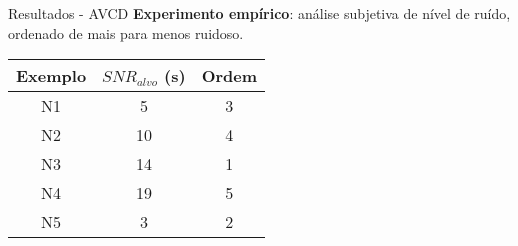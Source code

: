 \begin{frame}{Resultados - AVCD}
    \textbf{Experimento empírico}: análise subjetiva de nível de ruído, ordenado de mais para menos ruidoso.
    \vspace{1cm}
    
    \begin{table} [H]
        \centering
        \begin{tabular}{c|c|c}
    
            \textbf{Exemplo} & 
            \textbf{$SNR_{alvo}$ (s)} & 
            \textbf{Ordem} \\
            \hline 
    
            N1 &  5 & 3 \\
            N2 & 10 & 4 \\
            N3 & 14 & 1 \\
            N4 & 19 & 5 \\
            N5 &  3 & 2 \\
    
        \end{tabular}
    \end{table}
\end{frame}

